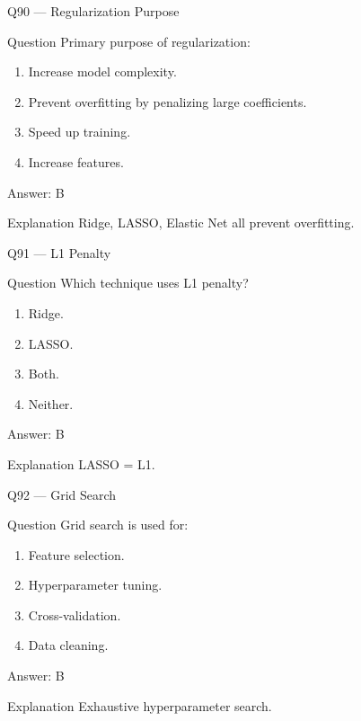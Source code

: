 \documentclass[aspectratio=169,8pt]{beamer}
\begin{document}
	\begin{frame}{Q90 --- Regularization Purpose}
		\begin{block}{Question}
			Primary purpose of regularization:
		\end{block}
		\begin{enumerate}
			\item Increase model complexity.
			\item Prevent overfitting by penalizing large coefficients.
			\item Speed up training.
			\item Increase features.
		\end{enumerate}
		\begin{exampleblock}{Answer: B}\end{exampleblock}
		\begin{block}{Explanation}
			Ridge, LASSO, Elastic Net all prevent overfitting.
		\end{block}
	\end{frame}
	
	\begin{frame}{Q91 --- L1 Penalty}
		\begin{block}{Question}
			Which technique uses L1 penalty?
		\end{block}
		\begin{enumerate}
			\item Ridge.
			\item LASSO.
			\item Both.
			\item Neither.
		\end{enumerate}
		\begin{exampleblock}{Answer: B}\end{exampleblock}
		\begin{block}{Explanation}
			LASSO = L1.
		\end{block}
	\end{frame}
	
	\begin{frame}{Q92 --- Grid Search}
		\begin{block}{Question}
			Grid search is used for:
		\end{block}
		\begin{enumerate}
			\item Feature selection.
			\item Hyperparameter tuning.
			\item Cross-validation.
			\item Data cleaning.
		\end{enumerate}
		\begin{exampleblock}{Answer: B}\end{exampleblock}
		\begin{block}{Explanation}
			Exhaustive hyperparameter search.
		\end{block}
	\end{frame}
	
\end{document}

